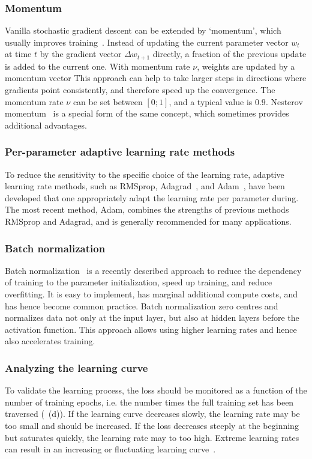 \subsubsection{Momentum}
Vanilla stochastic gradient descent can be extended by `momentum', which usually improves training~\citep{sutskever_training_2013}. Instead of updating the current parameter vector $w_t$ at time $t$ by the gradient vector $\Delta w_{t+1}$ directly, a fraction of the previous update is added to the current one. With momentum rate $\nu$, weights are updated by a momentum vector  This approach can help to take larger steps in directions where gradients point consistently, and therefore speed up the convergence. The momentum rate $\nu$ can be set between $[0;1]$, and a typical value is $0.9$. Nesterov momentum~\citep{nesterov_method_1983,nesterov_introductory_2013} is a special form of the same concept, which sometimes provides additional advantages.

\subsubsection{Per-parameter adaptive learning rate methods} \label{sec:dl_adapt}
To reduce the sensitivity to the specific choice of the learning rate, adaptive learning rate methods, such as RMSprop, Adagrad~\citep{duchi_adaptive_2011}, and Adam~\citep{kingma_adam:_2014}, have been developed that one appropriately adapt the learning rate per parameter during. The most recent method, Adam, combines the strengths of previous methods RMSprop and Adagrad, and is generally recommended for many applications.

\subsubsection{Batch normalization}
Batch normalization~\citep{ioffe_batch_2015} is a recently described approach to reduce the dependency of training to the parameter initialization, speed up training, and reduce overfitting. It is easy to implement, has marginal additional compute costs, and has hence become common practice. Batch normalization zero centres and normalizes data not only at the input layer, but also at hidden layers before the activation function. This approach allows using higher learning rates and hence also accelerates training.

\subsubsection{Analyzing the learning curve}
To validate the learning process, the loss should be monitored as a function of the number of training epochs, i.e. the number times the full training set has been traversed (~(d)). If the learning curve decreases slowly, the learning rate may be too small and should be increased. If the loss decreases steeply at the beginning but saturates quickly, the learning rate may to too high. Extreme learning rates can result in an increasing or fluctuating learning curve~\citep{bengio_practical_2012,karpathy_cs231n_2016}.


